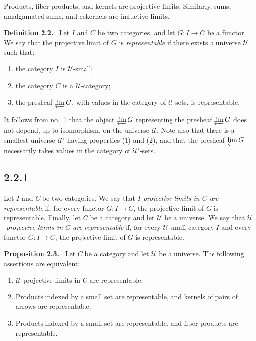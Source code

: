 \documentclass[11pt]{article}
\newcommand{\U}{\mathcal{U}}
\newenvironment{statement}[1]{\par\medskip\noindent\textbf{#1.}\ }{\par\medskip}
\begin{document}
Products, fiber products, and kernels are projective limits. Similarly, sums, amalgamated sums, and cokernels are inductive limits.

\begin{statement}{Definition 2.2}
Let $I$ and $C$ be two categories, and let $G:I\to C$ be a functor. We say that the projective limit of $G$ is \emph{representable} if there exists a universe $\U$ such that:
\begin{enumerate}[label=\arabic*)]
\item the category $I$ is $\U$-small;
\item the category $C$ is a $\U$-category;
\item the presheaf $\varprojlim G$, with values in the category of $\U$-sets, is representable.
\end{enumerate}
\end{statement}

It follows from no.~1 that the object $\varprojlim G$ representing the presheaf $\varprojlim G$ does not depend, up to isomorphism, on the universe $\U$. Note also that there is a smallest universe $\U'$ having properties (1) and (2), and that the presheaf $\varprojlim G$ necessarily takes values in the category of $\U'$-sets.

\subsection*{2.2.1}
Let $I$ and $C$ be two categories. We say that \emph{$I$-projective limits in $C$ are representable} if, for every functor $G:I\to C$, the projective limit of $G$ is representable. Finally, let $C$ be a category and let $\U$ be a universe. We say that \emph{$\U$-projective limits in $C$ are representable} if, for every $\U$-small category $I$ and every functor $G:I\to C$, the projective limit of $G$ is representable.

\begin{statement}{Proposition 2.3}
Let $C$ be a category and let $\U$ be a universe. The following assertions are equivalent:
\begin{enumerate}[label=\roman*)]
\item $\U$-projective limits in $C$ are representable.
\item Products indexed by a small set are representable, and kernels of pairs of arrows are representable.
\item Products indexed by a small set are representable, and fiber products are representable.
\end{enumerate}
\end{statement}
\end{document}
